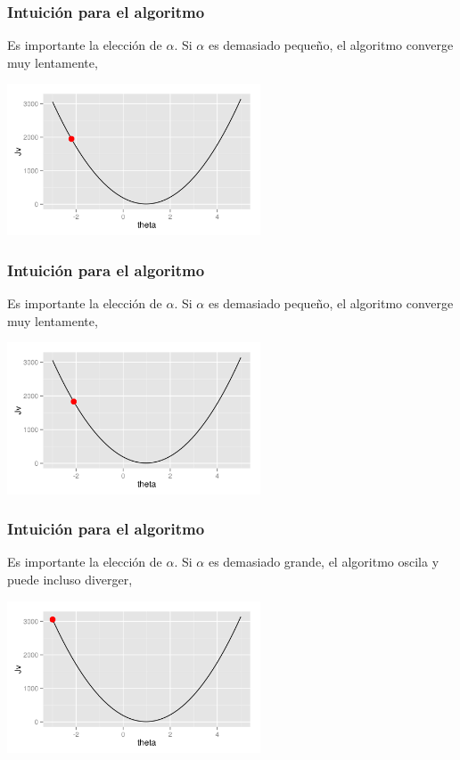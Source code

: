 \documentclass[aspectratio=169]{beamer}
\begin{document}
\begin{frame}
 \frametitle{Intuición para el algoritmo}
 \begin{overlayarea}{\textwidth}{8cm}
Es importante la elección de $\alpha$. Si $\alpha$ es demasiado pequeño, el algoritmo converge muy lentamente,
\begin{center}
  \includegraphics[height=4.5cm]{gradientdescent-smallalpha-9.png}
\end{center}
 \end{overlayarea}
\end{frame}

\begin{frame}
 \frametitle{Intuición para el algoritmo}
 \begin{overlayarea}{\textwidth}{8cm}
Es importante la elección de $\alpha$. Si $\alpha$ es demasiado pequeño, el algoritmo converge muy lentamente,
\begin{center}
  \includegraphics[height=4.5cm]{gradientdescent-smallalpha-10.png}
\end{center}
 \end{overlayarea}
\end{frame}

\begin{frame}
 \frametitle{Intuición para el algoritmo}
 \begin{overlayarea}{\textwidth}{8cm}
Es importante la elección de $\alpha$. Si $\alpha$ es demasiado grande, el algoritmo oscila y puede incluso diverger,
\begin{center}
  \includegraphics[height=4.5cm]{gradientdescent-bigalpha-1.png}
\end{center}
 \end{overlayarea}
\end{frame}
\end{document}
